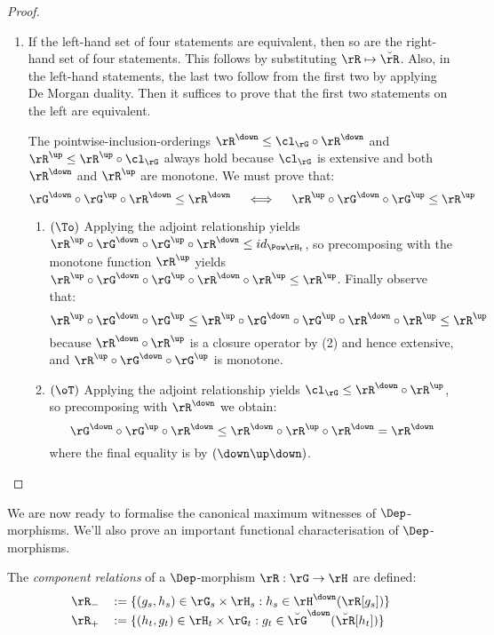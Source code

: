 \documentclass{article}
\begin{document}
\begin{proof}
\begin{enumerate}
\item
If the left-hand set of four statements are equivalent, then so are the right-hand set of four statements. This follows by substituting $\rR \mapsto \breve{\rR}$. Also, in the left-hand statements, the last two follow from the first two by applying De Morgan duality. Then it suffices to prove that the first two statements on the left are equivalent.

The pointwise-inclusion-orderings $\rR^\down \leq \cl_\rG \circ \rR^\down$ and $\rR^\up \leq \rR^\up \circ \cl_\rG$ always hold because $\cl_\rG$ is extensive and both $\rR^\down$ and $\rR^\up$ are monotone. We must prove that:
\[
\rG^\down \circ \rG^\up \circ \rR^\down \leq \rR^\down 
\quad\iff\quad
\rR^\up \circ \rG^\down \circ \rG^\up  \leq \rR^\up
\]
\begin{enumerate}
\item
$(\To)$ Applying the adjoint relationship yields $\rR^\up \circ \rG^\down \circ \rG^\up \circ \rR^\down \leq id_{\Pow \rH_t}$, so precomposing with the monotone function $\rR^\up$ yields $\rR^\up \circ \rG^\down \circ \rG^\up \circ \rR^\down \circ \rR^\up \leq \rR^\up$. Finally observe that:
\[
\rR^\up \circ \rG^\down \circ \rG^\up
\leq
\rR^\up \circ \rG^\down \circ \rG^\up \circ \rR^\down \circ \rR^\up
\leq \rR^\up
\]
because $\rR^\down \circ \rR^\up$ is a closure operator by (2) and hence extensive, and $\rR^\up \circ \rG^\down \circ \rG^\up$ is monotone.

\item
$(\oT)$ Applying the adjoint relationship yields $\cl_\rG \leq \rR^\down \circ \rR^\up$, so precomposing with $\rR^\down$ we obtain:
\[
\rG^\down \circ \rG^\up \circ \rR^\down 
\leq 
\rR^\down \circ \rR^\up \circ \rR^\down 
= \rR^\down
\]
where the final equality is by $(\down\up\down)$.
\end{enumerate}

\end{enumerate}
\end{proof}


We are now ready to formalise the canonical maximum witnesses of $\Dep$-morphisms. We'll also prove an important functional characterisation of $\Dep$-morphisms.

\begin{definition}
\label{def:bicliq_mor_components}
The \emph{component relations} of a $\Dep$-morphism $\rR : \rG \to \rH$ are defined:
\[
\begin{tabular}{ll}
$\rR_-$ & $:= \{ (g_s,h_s) \in \rG_s \times \rH_s : h_s \in \rH^\down(\rR[g_s]) \}$
\\
$\rR_+$ & $:= \{ (h_t,g_t) \in \rH_t \times \rG_t : g_t \in \breve{\rG}^\down(\breve{\rR}[h_t]) \}$
\end{tabular}
\]
\endbox
\end{definition}
\end{document}
